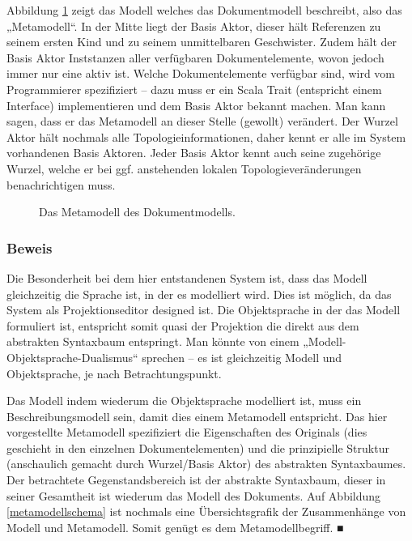 Abbildung \ref{metamodell} zeigt das Modell welches das Dokumentmodell beschreibt, also das „Metamodell“. In der Mitte liegt der Basis Aktor, dieser hält Referenzen zu seinem ersten Kind und zu seinem unmittelbaren Geschwister. Zudem hält der Basis Aktor Inststanzen aller verfügbaren Dokumentelemente, wovon jedoch immer nur eine aktiv ist. Welche Dokumentelemente verfügbar sind, wird vom Programmierer spezifiziert -- dazu muss er ein Scala Trait (entspricht einem Interface) implementieren und dem Basis Aktor bekannt machen. Man kann sagen, dass er das Metamodell an dieser Stelle (gewollt) verändert. Der Wurzel Aktor hält nochmals alle Topologieinformationen, daher kennt er alle im System vorhandenen Basis Aktoren. Jeder Basis Aktor kennt auch seine zugehörige Wurzel, welche er bei ggf. anstehenden lokalen Topologieveränderungen benachrichtigen muss.

 
\begin{figure}[h!]
\centering
\advance\leftskip-2.5cm
\caption{ Das Metamodell des Dokumentmodells. }\label{metamodell}
\end{figure}
 
\subsubsection{Beweis}\label{}

 
Die Besonderheit bei dem hier entstandenen System ist, dass das Modell gleichzeitig die Sprache ist, in der es modelliert wird. Dies ist möglich, da das System als Projektionseditor designed ist. Die Objektsprache in der das Modell formuliert ist, entspricht somit quasi der Projektion die direkt aus dem abstrakten Syntaxbaum entspringt. Man könnte von einem „Modell-Objektsprache-Dualismus“ sprechen -- es ist gleichzeitig Modell und Objektsprache, je nach Betrachtungspunkt.

 
Das Modell indem wiederum die Objektsprache modelliert ist, muss ein Beschreibungsmodell sein, damit dies einem Metamodell entspricht. Das hier vorgestellte Metamodell spezifiziert die Eigenschaften des Originals (dies geschieht in den einzelnen Dokumentelementen) und die prinzipielle Struktur (anschaulich gemacht durch Wurzel/Basis Aktor) des abstrakten Syntaxbaumes. Der betrachtete Gegenstandsbereich ist der abstrakte Syntaxbaum, dieser in seiner Gesamtheit ist wiederum das Modell des Dokuments. Auf Abbildung \ref{metamodellschema} ist nochmals eine Übersichtsgrafik der Zusammenhänge von Modell und Metamodell. Somit genügt es dem Metamodellbegriff. ■

